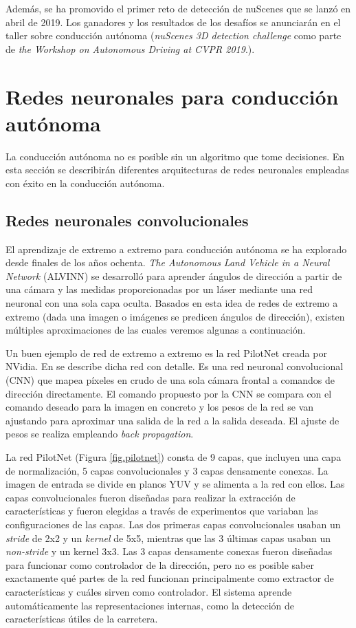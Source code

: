 Además, se ha promovido el primer reto de detección de nuScenes que se lanzó en abril de 2019. Los ganadores y los resultados de los desafíos se anunciarán en el taller sobre conducción autónoma (\textit{nuScenes 3D detection challenge} como parte de \textit{the Workshop on Autonomous Driving at CVPR 2019}.).

\section{Redes neuronales para conducción autónoma}
\label{sec:nets}

La conducción autónoma no es posible sin un algoritmo que tome decisiones. En esta sección se describirán diferentes arquitecturas de redes neuronales empleadas con éxito en la conducción autónoma.

\subsection{Redes neuronales convolucionales}

El aprendizaje de extremo a extremo para conducción autónoma se ha explorado desde finales de los años ochenta. \textit{The Autonomous Land Vehicle in a Neural Network} (ALVINN) \cite{alvinn}  se desarrolló para aprender ángulos de dirección a partir de una cámara y las medidas proporcionadas por un láser mediante una red neuronal con una sola capa oculta. Basados en esta idea de redes de extremo a extremo (dada una imagen o imágenes se predicen ángulos de dirección), existen múltiples aproximaciones \cite{road} \cite{end2end} \cite{interpretable} de las cuales veremos algunas a continuación.

Un buen ejemplo de red de extremo a extremo es la red PilotNet  \cite{end2end} \cite{explaining-end2end} creada por NVidia. En \cite{end2end} se describe dicha red con detalle. Es una red neuronal convolucional (CNN) que mapea píxeles en crudo de una sola cámara frontal a comandos de dirección directamente. El comando propuesto por la CNN se compara con el comando deseado para la imagen en concreto y los pesos de la red se van ajustando para aproximar una salida de la red a la salida deseada. El ajuste de pesos se realiza empleando \textit{back propagation}.

La red PilotNet (Figura \ref{fig.pilotnet})  consta de 9 capas, que incluyen una capa de normalización, 5 capas convolucionales y 3 capas densamente conexas. La imagen de entrada se divide en planos YUV y se alimenta a la red con ellos. Las capas convolucionales fueron diseñadas para realizar la extracción de características y fueron elegidas a través de experimentos que variaban las configuraciones de las capas. Las dos primeras capas convolucionales usaban un \textit{stride} de 2x2 y un \textit{kernel} de 5x5, mientras que las 3 últimas capas usaban un \textit{non-stride} y un kernel 3x3. Las 3 capas densamente conexas fueron diseñadas para funcionar como controlador de la dirección, pero no es posible saber exactamente qué partes de la red funcionan principalmente como extractor de características y cuáles sirven como controlador. El sistema aprende automáticamente las representaciones internas, como la detección de características útiles de la carretera.

